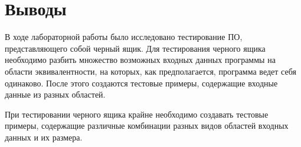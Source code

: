 \documentclass[a4paper,14pt]{extarticle}
\begin{document}
    \section{Выводы}

    В ходе лабораторной работы было исследовано тестирование ПО,
    представляющего собой черный ящик. Для тестирования черного ящика
    необходимо разбить множество возможных входных данных программы на
    области эквивалентности, на которых, как предполагается, программа ведет
    себя одинаково. После этого создаются тестовые примеры, содержащие входные
    данные из разных областей. 
    
    При тестировании черного ящика крайне необходимо создавать тестовые примеры,
    содержащие различные комбинации разных видов областей входных данных и их размера.
\end{document}
